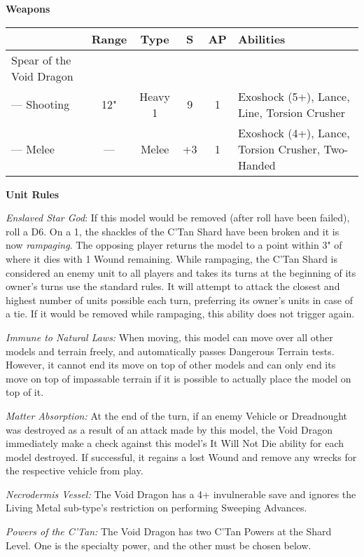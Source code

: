 \begin{minipage}[t]{0.72\textwidth}
	\vspace*{2em}
	\textbf{Weapons}
	
	\begin{tabular}{m{95 pt} *{4}{c} >{\raggedright\arraybackslash}p{130pt}}
		& Range & Type & S & AP & Abilities \\
		\hline
		Spear of the Void Dragon & & & & & \\
		— Shooting & 12" & Heavy 1 & 9 & 1 & Exoshock (5+), Lance, Line, Torsion Crusher \\
		— Melee & — & Melee & +3 & 1 & Exoshock (4+), Lance, Torsion Crusher, Two-Handed \\
	\end{tabular}
	
	\vspace*{2em}
	\textbf{Unit Rules}
	
	\textit{Enslaved Star God}: If this model would be removed (after  roll have been failed), roll a D6. On a 1, the shackles of the C'Tan Shard have been broken and it is now \textit{rampaging}. The opposing player returns the model to a point within 3" of where it dies with 1 Wound remaining. While rampaging, the C'Tan Shard is considered an enemy unit to all players and takes its turns at the beginning of its owner's turns use the standard rules. It will attempt to attack the closest and highest number of units possible each turn, preferring its owner's units in case of a tie. If it would be removed while rampaging, this ability does not trigger again.
	
	\textit{Immune to Natural Laws:} When moving, this model can move over all other models and terrain freely, and automatically passes Dangerous Terrain tests. However, it cannot end its move on top of other models and can only end its move on top of impassable terrain if it is possible to actually place the model on top of it.
	
	\textit{Matter Absorption:} At the end of the turn, if an enemy Vehicle or Dreadnought was destroyed as a result of an attack made by this model, the Void Dragon immediately make a check against this model's It Will Not Die ability for each model destroyed. If successful, it regains a lost Wound and remove any wrecks for the respective vehicle from play.
	
	\textit{Necrodermis Vessel:} The Void Dragon has a 4+ invulnerable save and ignores the Living Metal sub-type's restriction on performing Sweeping Advances.
	
	\textit{Powers of the C'Tan:} The Void Dragon has two C'Tan Powers at the Shard Level. One is the  specialty power, and the other must be chosen below.
	

\end{minipage}
